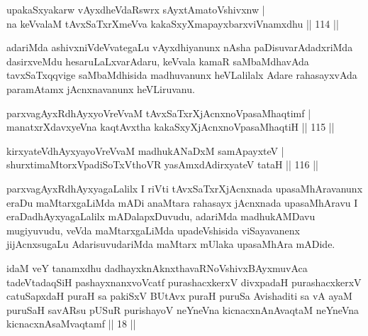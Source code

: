 
\begin{shl}
upakaSxyakarw vAyxdheVdaRswrx sAyxtAmatoV\s shivxnw |\\
na keVvalaM tAvxSaTxrXmeVva kakaSxyXmapayxbarxviVnamxdhu \hfill || 114 ||
\end{shl}

\begin{artha}
adariMda ashivxniVdeVvategaLu vAyxdhiyanunx nAsha paDisuvarAdadxriMda dasirxveMdu hesaruLaLxvarAdaru, keVvala kamaR saMbaMdhavAda tavxSaTxqqvige saMbaMdhisida madhuvanunx heVLalilalx Adare rahasayxvAda paramAtamx jAcnxnavanunx heVLiruvanu.
\end{artha}


\begin{shl}
parxvagAyxRdhAyxyoVreVvaM tAvxSaTxrXjAcnxnoVpasaMhaqtimf |\\
manatxrXdavxyeVna kaqtAvx\s tha kakaSxyXjAcnxnoVpasaMhaqtiH \hfill || 115 ||
\end{shl}
\begin{shl}
kirxyateV\s dhAyxyayoVreVvaM madhukANaDxM samApayxteV |\\
shurxtimaMtorxVpadiSoTxV\s thoVR yasAmxdAdirxyateV tataH \hfill || 116 ||
\end{shl}

\begin{artha}
parxvagAyxRdhAyxyagaLalilx I riVti tAvxSaTxrXjAcnxnada upasaMhAravanunx eraDu maMtarxgaLiMda mADi anaMtara rahasayx jAcnxnada upasaMhAravu I eraDadhAyxyagaLalilx mADalapxDuvudu, adariMda madhukAMDavu mugiyuvudu, veVda maMtarxgaLiMda upadeVshisida viSayavanenx jijAcnxsugaLu AdarisuvudariMda maMtarx mUlaka upasaMhAra mADide.
\end{artha}

\centerline{}

\begin{shl}
idaM veY tanamxdhu dadhayxknAknxthavaRNoV\s shivxBAyxmuvAca tadeVtadaqSiH pashayxnanxvoVcatf purashacxkerxV divxpadaH purashacxkerxV catuSapxdaH puraH sa pakiSxV BUtAvx puraH puruSa Avishaditi sa vA ayaM puruSaH savARsu pUSuR purishayoV neYneVna kicnacxnAnAvaqtaM neYneVna kicnacxnAsaMvaqtamf || 18 ||
\end{shl}


